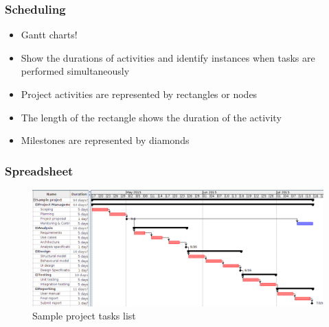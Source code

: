 
\begin{frame}[t]\frametitle{Scheduling}
\begin{itemize}
    	\item Gantt charts!
    	\item Show the durations of activities and identify instances when tasks are performed simultaneously
    	\item Project activities are represented by rectangles or nodes
    	\item The length of the rectangle shows the duration of the activity
    	\item Milestones are represented by diamonds
    \end{itemize}
\end{frame}

\begin{frame}[t]\frametitle{Spreadsheet}
\begin{figure}[htb!]
    \begin{center}
        \includegraphics[width=6in]{../img/sample_gantt}
    \end{center}
    \caption{Sample project tasks list}
    \label{fig:figure1}
\end{figure}

\end{frame}


